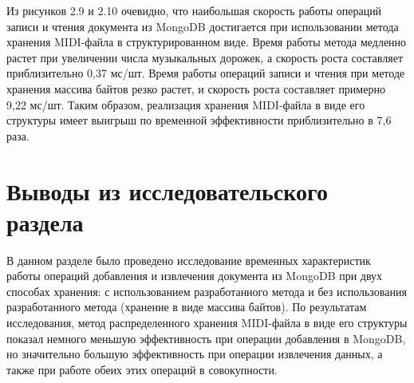Из рисунков 2.9 и 2.10 очевидно, что наибольшая скорость работы операций записи и чтения документа из MongoDB достигается при использовании метода хранения MIDI-файла в структурированном виде. Время работы метода медленно растет при увеличении числа музыкальных дорожек, а скорость роста составляет приблизительно 0,37 мс/шт. Время работы операций записи и чтения при методе хранения массива байтов резко растет, и скорость роста составляет примерно 9,22 мс/шт. Таким образом, реализация хранения MIDI-файла в виде его структуры имеет выигрыш по временной эффективности приблизительно в 7,6 раза. 

\section{Выводы из исследовательского раздела}

В данном разделе было проведено исследование временных характеристик работы операций добавления и извлечения документа из MongoDB при двух способах хранения: с использованием разработанного метода и без использования разработанного метода (хранение в виде массива байтов). По результатам исследования, метод распределенного хранения MIDI-файла в виде его структуры показал немного меньшую эффективность при операции добавления в MongoDB, но значительно большую эффективность при операции извлечения данных, а также при работе обеих этих операций в совокупности. 


